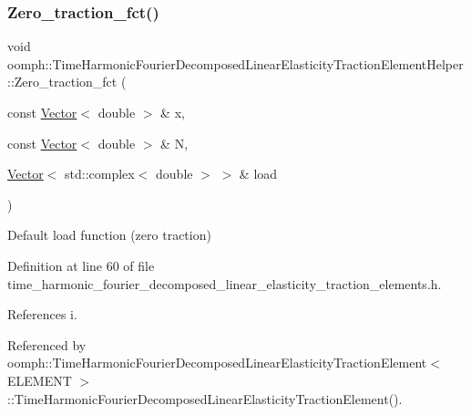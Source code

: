 \subsubsection{\texorpdfstring{Zero\+\_\+traction\+\_\+fct()}{Zero\_traction\_fct()}}
{\footnotesize\ttfamily void oomph\+::\+Time\+Harmonic\+Fourier\+Decomposed\+Linear\+Elasticity\+Traction\+Element\+Helper\+::\+Zero\+\_\+traction\+\_\+fct (\begin{DoxyParamCaption}\item[{const \hyperlink{classoomph_1_1Vector}{Vector}$<$ double $>$ \&}]{x,  }\item[{const \hyperlink{classoomph_1_1Vector}{Vector}$<$ double $>$ \&}]{N,  }\item[{\hyperlink{classoomph_1_1Vector}{Vector}$<$ std\+::complex$<$ double $>$ $>$ \&}]{load }\end{DoxyParamCaption})}



Default load function (zero traction) 



Definition at line 60 of file time\+\_\+harmonic\+\_\+fourier\+\_\+decomposed\+\_\+linear\+\_\+elasticity\+\_\+traction\+\_\+elements.\+h.



References i.



Referenced by oomph\+::\+Time\+Harmonic\+Fourier\+Decomposed\+Linear\+Elasticity\+Traction\+Element$<$ E\+L\+E\+M\+E\+N\+T $>$\+::\+Time\+Harmonic\+Fourier\+Decomposed\+Linear\+Elasticity\+Traction\+Element().

